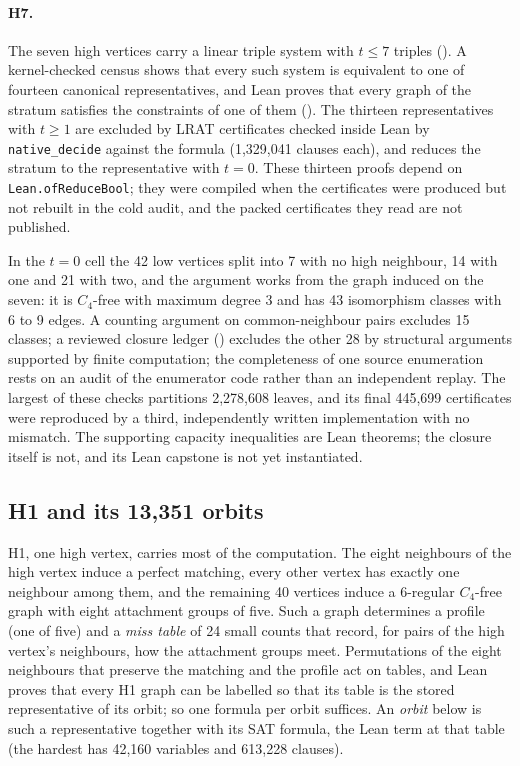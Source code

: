 \documentclass{anvil-paper}
\newcommand{\repobase}{https://github.com/rjwalters/lean-genius/blob/erdos85/integration}
\newcommand{\repofile}[2]{\href{\repobase/#1}{\lean{#2}}}
\newcommand{\rp}{research/problems/erdos-85-wip-01}
\theoremstyle{definition}
\begin{document}
\paragraph{H7.} The seven high vertices carry a linear triple system with $t\le 7$ triples (). A kernel-checked census shows that every such system is equivalent to one of fourteen canonical representatives, and Lean proves that every graph of the stratum satisfies the constraints of one of them (). The thirteen representatives with $t\ge 1$ are excluded by LRAT certificates checked inside Lean by \texttt{native\_decide} against the formula  (1,329,041 clauses each), and  reduces the stratum to the representative with $t=0$. These thirteen proofs depend on \texttt{Lean.ofReduceBool}; they were compiled when the certificates were produced but not rebuilt in the cold audit, and the packed certificates they read are not published.

In the $t=0$ cell the 42 low vertices split into 7 with no high neighbour, 14 with one and 21 with two, and the argument works from the graph induced on the seven: it is $C_4$-free with maximum degree 3 and has 43 isomorphism classes with 6 to 9 edges. A counting argument on common-neighbour pairs excludes 15 classes; a reviewed closure ledger (\repofile{\rp/H7_CLOSURE_20260915.md}{H7_CLOSURE_20260915.md}) excludes the other 28 by structural arguments supported by finite computation; the completeness of one source enumeration rests on an audit of the enumerator code rather than an independent replay. The largest of these checks partitions 2,278,608 leaves, and its final 445,699 certificates were reproduced by a third, independently written implementation with no mismatch. The supporting capacity inequalities are Lean theorems; the closure itself is not, and its Lean capstone  is not yet instantiated.

\subsection{H1 and its 13,351 orbits}\label{sec:h1-structure}

H1, one high vertex, carries most of the computation. The eight neighbours of the high vertex induce a perfect matching, every other vertex has exactly one neighbour among them, and the remaining 40 vertices induce a 6-regular $C_4$-free graph with eight attachment groups of five. Such a graph determines a profile (one of five) and a \emph{miss table} of 24 small counts that record, for pairs of the high vertex's neighbours, how the attachment groups meet. Permutations of the eight neighbours that preserve the matching and the profile act on tables, and Lean proves that every H1 graph can be labelled so that its table is the stored representative of its orbit; so one formula per orbit suffices. An \emph{orbit} below is such a representative together with its SAT formula, the Lean term  at that table (the hardest has 42,160 variables and 613,228 clauses).
\end{document}
